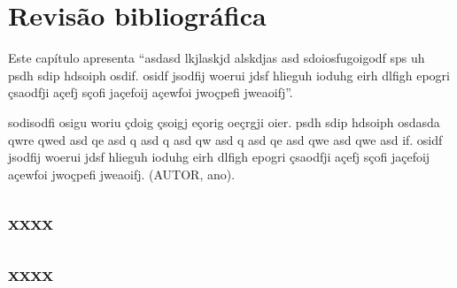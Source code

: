 \chapter{Revisão bibliográfica}

Este capítulo apresenta ``asdasd lkjlaskjd alskdjas asd  sdoiosfugoigodf sps uh psdh sdip hdsoiph osdif. osidf jsodfij woerui jdsf hlieguh ioduhg eirh dlfigh epogri çsaodfji açefj sçofi jaçefoij açewfoi jwoçpefi jweaoifj''.

\begin{citacao}
sodisodfi osigu woriu çdoig çsoigj eçorig oeçrgji oier.  psdh sdip hdsoiph osdasda qwre qwed asd qe asd q asd q asd qw asd q asd qe asd qwe asd qwe asd if. osidf jsodfij woerui jdsf hlieguh ioduhg eirh dlfigh epogri çsaodfji açefj sçofi jaçefoij açewfoi jwoçpefi jweaoifj. (AUTOR, ano).
\end{citacao}


\section{xxxx}


\section{xxxx}